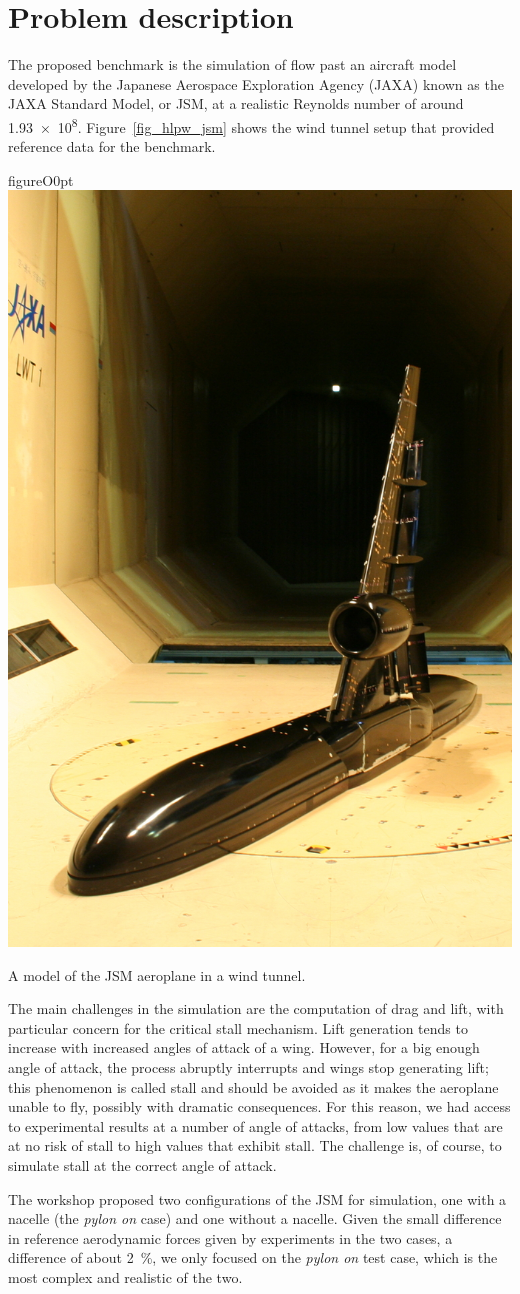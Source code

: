 \section{Problem description}
\label{sec_problem}
The proposed benchmark is the simulation of flow past an aircraft model developed by the Japanese Aerospace Exploration Agency (JAXA) known as the JAXA Standard Model, or JSM, at a realistic Reynolds number of around \num{1.93e8}.
Figure~\ref{fig_hlpw_jsm} shows the wind tunnel setup that provided reference data for the benchmark.
\begin{wrapfloat}{figure}{O}{0pt}
  \centering
    \includegraphics[width=0.5\columnwidth]{img/hlpw/jsm}
    \caption{A model of the JSM aeroplane in a wind tunnel.}
    \label{fig_hlpw_jsm}
\end{wrapfloat}
The main challenges in the simulation are the computation of drag and lift, with particular concern for the critical stall mechanism.
Lift generation tends to increase with increased angles of attack of a wing.
However, for a big enough angle of attack, the process abruptly interrupts and wings stop generating lift;
this phenomenon is called stall and should be avoided as it makes the aeroplane unable to fly, possibly with dramatic consequences.
For this reason, we had access to experimental results at a number of angle of attacks, from low values that are at no risk of stall to high values that exhibit stall.
The challenge is, of course, to simulate stall at the correct angle of attack.

The workshop proposed two configurations of the JSM for simulation, one with a nacelle (the \emph{pylon on} case) and one without a nacelle.
Given the small difference in reference aerodynamic forces given by experiments in the two cases, a difference of about \SI{2}{\percent}, we only focused on the \emph{pylon on} test case, which is the most complex and realistic of the two.

